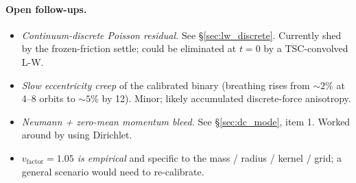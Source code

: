 \documentclass[11pt,a4paper]{article}
\begin{document}
\paragraph{Open follow-ups.}
\begin{itemize}[leftmargin=*,nosep]
  \item \emph{Continuum-discrete Poisson residual.}  See
    \S\ref{sec:lw_discrete}.  Currently shed by the frozen-friction
    settle; could be eliminated at $t=0$ by a TSC-convolved L-W.
  \item \emph{Slow eccentricity creep} of the calibrated binary
    (breathing rises from $\sim 2\%$ at 4--8 orbits to $\sim 5\%$ by
    12).  Minor; likely accumulated discrete-force anisotropy.
  \item \emph{Neumann + zero-mean momentum bleed.}  See
    \S\ref{sec:dc_mode}, item 1.  Worked around by using Dirichlet.
  \item \emph{$v_\text{factor}=1.05$ is empirical} and specific to the
    mass / radius / kernel / grid; a general scenario would need to
    re-calibrate.
\end{itemize}
\end{document}
